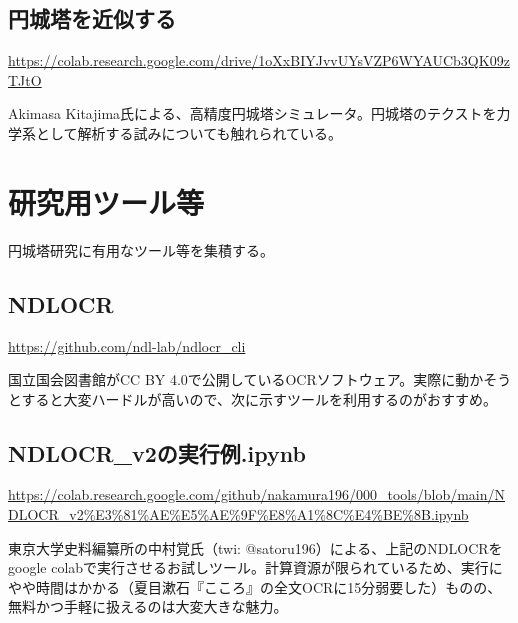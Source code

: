 \documentclass[10pt, a5paper, twoside]{jsarticle}
\theoremstyle{definition}
\begin{document}
		\subsection{円城塔を近似する}

			\url{https://colab.research.google.com/drive/1oXxBIYJvvUYsVZP6WYAUCb3QK09zTJtO}

			Akimasa Kitajima氏による、高精度円城塔シミュレータ。円城塔のテクストを力学系として解析する試みについても触れられている。

	\section{研究用ツール等}

		円城塔研究に有用なツール等を集積する。

		\subsection{NDLOCR}

			\url{https://github.com/ndl-lab/ndlocr_cli}

			国立国会図書館がCC BY 4.0で公開しているOCRソフトウェア。実際に動かそうとすると大変ハードルが高いので、次に示すツールを利用するのがおすすめ。

		\subsection{NDLOCR\_v2の実行例.ipynb}

			\url{https://colab.research.google.com/github/nakamura196/000_tools/blob/main/NDLOCR_v2%E3%81%AE%E5%AE%9F%E8%A1%8C%E4%BE%8B.ipynb}

			東京大学史料編纂所の中村覚氏（twi: @satoru196）による、上記のNDLOCRをgoogle colabで実行させるお試しツール。計算資源が限られているため、実行にやや時間はかかる（夏目漱石『こころ』の全文OCRに15分弱要した）ものの、無料かつ手軽に扱えるのは大変大きな魅力。
\end{document}
